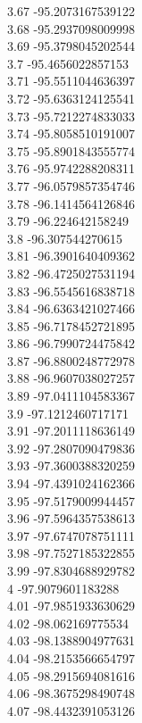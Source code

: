{3.67	-95.2073167539122\\
3.68	-95.2937098009998\\
3.69	-95.3798045202544\\
3.7	-95.4656022857153\\
3.71	-95.5511044636397\\
3.72	-95.6363124125541\\
3.73	-95.7212274833033\\
3.74	-95.8058510191007\\
3.75	-95.8901843555774\\
3.76	-95.9742288208311\\
3.77	-96.0579857354746\\
3.78	-96.1414564126846\\
3.79	-96.224642158249\\
3.8	-96.307544270615\\
3.81	-96.3901640409362\\
3.82	-96.4725027531194\\
3.83	-96.5545616838718\\
3.84	-96.6363421027466\\
3.85	-96.7178452721895\\
3.86	-96.7990724475842\\
3.87	-96.8800248772978\\
3.88	-96.9607038027257\\
3.89	-97.0411104583367\\
3.9	-97.1212460717171\\
3.91	-97.2011118636149\\
3.92	-97.2807090479836\\
3.93	-97.3600388320259\\
3.94	-97.4391024162366\\
3.95	-97.5179009944457\\
3.96	-97.5964357538613\\
3.97	-97.6747078751111\\
3.98	-97.7527185322855\\
3.99	-97.8304688929782\\
4	-97.9079601183288\\
4.01	-97.9851933630629\\
4.02	-98.062169775534\\
4.03	-98.1388904977631\\
4.04	-98.2153566654797\\
4.05	-98.2915694081616\\
4.06	-98.3675298490748\\
4.07	-98.4432391053126\\
}

